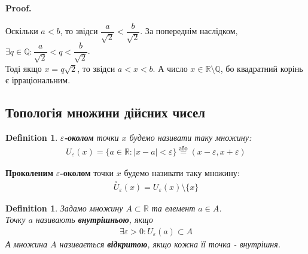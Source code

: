 \documentclass[a4paper, 14pt]{article}
\makeatletter
\def\qed{$\blacksquare$}
\theoremstyle{theoremdd}
\theoremstyle{theoremdd}
\newtheorem{definition}[theorem]{Definition}
\theoremstyle{theoremdd}
\theoremstyle{theoremdd}
\theoremstyle{theoremdd}
\theoremstyle{theoremdd}
\theoremstyle{theoremdd}
\theoremstyle{theoremdd}
\renewenvironment{proof}[1][Proof.\\]{\par
\pushQED{\hfill \qed}%
\normalfont \topsep6\p@\@plus6\p@\relax
\trivlist
\item\relax
{\bfseries
#1\@addpunct{.}}\hspace\labelsep\ignorespaces
}{%
\popQED\endtrivlist\@endpefalse
}
\makeatother
\begin{document}
	\begin{proof}
	Оскільки $a < b$, то звідси $\dfrac{a}{\sqrt{2}} < \dfrac{b}{\sqrt{2}}$. За попереднім наслідком, $\exists q \in \mathbb{Q}: \dfrac{a}{\sqrt{2}} < q < \dfrac{b}{\sqrt{2}}$.\\
	Тоді якщо $x = q \sqrt{2}$, то звідси $a < x < b$. А число $x \in \mathbb{R} \setminus \mathbb{Q}$, бо квадратний корінь є ірраціональним.
	\end{proof}
	
	\subsection{Топологія множини дійсних чисел}
	\begin{definition}
	$\varepsilon$\textbf{-околом} точки $x$ будемо називати таку множину:
	\begin{align*}
	U_{\varepsilon}(x) = \{a \in \mathbb{R}: |x-a| < \varepsilon \} \overset{\text{або}}{=} (x-\varepsilon,x+\varepsilon)
	\end{align*}
	\end{definition}
	
	\begin{figure}[H]
	\centering
	\end{figure}
	\textbf{Проколеним} $\varepsilon$\textbf{-околом} точки $x$ будемо називати таку множину:
	\begin{align*}
	\overset{\circ}{U}_{\varepsilon}(x) = U_{\varepsilon}(x) \setminus \{x\}
	\end{align*}
\begin{definition}
Задамо множину $A \subset \mathbb{R}$ та елемент $a \in A$.\\
Точку $a$ називають \textbf{внутрішньою}, якщо
\begin{align*}
\exists \varepsilon > 0: U_{\varepsilon}(a) \subset A
\end{align*}
А множина $A$ називається \textbf{відкритою}, якщо кожна її точка - внутрішня.
\end{definition}
\end{document}
